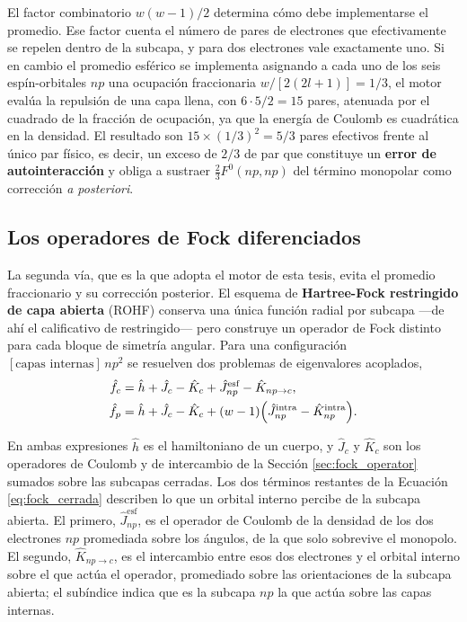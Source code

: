 El factor combinatorio $w(w-1)/2$ determina cómo debe implementarse el promedio. Ese factor cuenta el número de pares de electrones que efectivamente se repelen dentro de la subcapa, y para dos electrones vale exactamente uno. Si en cambio el promedio esférico se implementa asignando a cada uno de los seis espín-orbitales $np$ una ocupación fraccionaria $w/[2(2l+1)] = 1/3$, el motor evalúa la repulsión de una capa llena, con $6\cdot 5/2 = 15$ pares, atenuada por el cuadrado de la fracción de ocupación, ya que la energía de Coulomb es cuadrática en la densidad. El resultado son $15 \times (1/3)^2 = 5/3$ pares efectivos frente al único par físico, es decir, un exceso de $2/3$ de par que constituye un \textbf{error de autointeracción} y obliga a sustraer $\tfrac{2}{3}F^0(np,np)$ del término monopolar como corrección \textit{a posteriori}.

\subsection{Los operadores de Fock diferenciados}

La segunda vía, que es la que adopta el motor de esta tesis, evita el promedio fraccionario y su corrección posterior. El esquema de \textbf{Hartree-Fock restringido de capa abierta} (ROHF) conserva una única función radial por subcapa —de ahí el calificativo de restringido— pero construye un operador de Fock distinto para cada bloque de simetría angular. Para una configuración $[\text{capas internas}]\,np^2$ se resuelven dos problemas de eigenvalores acoplados,
\begin{align}
    \hat{f}_c &= \hat{h} + \hat{J}_{c} - \hat{K}_{c} + \hat{J}_{np}^{\text{esf}} - \hat{K}_{np \to c}, \label{eq:fock_cerrada}\\
    \hat{f}_p &= \hat{h} + \hat{J}_{c} - \hat{K}_{c} + (w-1)\qty( \hat{J}_{np}^{\text{intra}} - \hat{K}_{np}^{\text{intra}} ). \label{eq:fock_abierta}
\end{align}

En ambas expresiones $\hat{h}$ es el hamiltoniano de un cuerpo, y $\hat{J}_{c}$ y $\hat{K}_{c}$ son los operadores de Coulomb y de intercambio de la Sección \ref{sec:fock_operator} sumados sobre las subcapas cerradas. Los dos términos restantes de la Ecuación \eqref{eq:fock_cerrada} describen lo que un orbital interno percibe de la subcapa abierta. El primero, $\hat{J}_{np}^{\text{esf}}$, es el operador de Coulomb de la densidad de los dos electrones $np$ promediada sobre los ángulos, de la que solo sobrevive el monopolo. El segundo, $\hat{K}_{np \to c}$, es el intercambio entre esos dos electrones y el orbital interno sobre el que actúa el operador, promediado sobre las orientaciones de la subcapa abierta; el subíndice indica que es la subcapa $np$ la que actúa sobre las capas internas.


